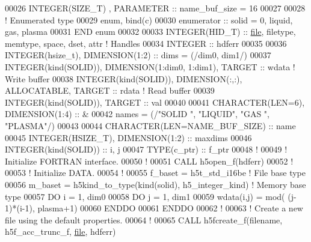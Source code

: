 \begin{DoxyCode}
00026   \textcolor{keywordtype}{INTEGER(SIZE\_T)}  , \textcolor{keywordtype}{PARAMETER} :: name\_buf\_size = 16
00027 
00028 \textcolor{comment}{! Enumerated type}
00029   enum, bind(c)
00030      enumerator :: solid = 0, liquid, gas, plasma
00031 \textcolor{keyword}{  END }enum
00032 
00033   \textcolor{keywordtype}{INTEGER(HID\_T)} :: \hyperlink{structfile}{file}, filetype, memtype, space, dset, attr \textcolor{comment}{! Handles}
00034   \textcolor{keywordtype}{INTEGER} :: hdferr
00035 
00036   \textcolor{keywordtype}{INTEGER(hsize\_t)},   \textcolor{keywordtype}{DIMENSION(1:2)} :: dims = (/dim0, dim1/)
00037   \textcolor{keywordtype}{INTEGER(kind(SOLID))}, \textcolor{keywordtype}{DIMENSION(1:dim0, 1:dim1)}, \textcolor{keywordtype}{TARGET} :: wdata \textcolor{comment}{! Write buffer}
00038   \textcolor{keywordtype}{INTEGER(kind(SOLID))}, \textcolor{keywordtype}{DIMENSION(:,:)}, \textcolor{keywordtype}{ALLOCATABLE}, \textcolor{keywordtype}{TARGET} :: rdata \textcolor{comment}{! Read buffer}
00039   \textcolor{keywordtype}{INTEGER(kind(SOLID))}, \textcolor{keywordtype}{TARGET} :: val
00040 
00041   \textcolor{keywordtype}{CHARACTER(LEN=6)}, \textcolor{keywordtype}{DIMENSION(1:4)} :: &
00042        names = (/\textcolor{stringliteral}{"SOLID "}, \textcolor{stringliteral}{"LIQUID"}, \textcolor{stringliteral}{"GAS   "}, \textcolor{stringliteral}{"PLASMA"}/)
00043 
00044   \textcolor{keywordtype}{CHARACTER(LEN=NAME\_BUF\_SIZE)} :: name
00045   \textcolor{keywordtype}{INTEGER(HSIZE\_T)}, \textcolor{keywordtype}{DIMENSION(1:2)} :: maxdims
00046   \textcolor{keywordtype}{INTEGER(kind(SOLID))} :: i, j
00047   \textcolor{keywordtype}{TYPE}(c\_ptr) :: f\_ptr
00048   \textcolor{comment}{!}
00049   \textcolor{comment}{! Initialize FORTRAN interface.}
00050   \textcolor{comment}{!}
00051   \textcolor{keyword}{CALL }h5open\_f(hdferr)
00052   \textcolor{comment}{!}
00053   \textcolor{comment}{! Initialize DATA.}
00054   \textcolor{comment}{!}
00055   f\_baset   = h5t\_std\_i16be      \textcolor{comment}{! File base type}
00056   m\_baset   = h5kind\_to\_type(kind(solid), h5\_integer\_kind) \textcolor{comment}{! Memory base type}
00057   \textcolor{keywordflow}{DO} i = 1, dim0
00058      \textcolor{keywordflow}{DO} j = 1, dim1 
00059         wdata(i,j) = mod( (j-1)*(i-1), plasma+1)
00060 \textcolor{keywordflow}{     ENDDO}
00061 \textcolor{keywordflow}{  ENDDO}
00062   \textcolor{comment}{!}
00063   \textcolor{comment}{! Create a new file using the default properties.}
00064   \textcolor{comment}{!}
00065   \textcolor{keyword}{CALL }h5fcreate\_f(filename, h5f\_acc\_trunc\_f, \hyperlink{structfile}{file}, hdferr)

\end{DoxyCode}
